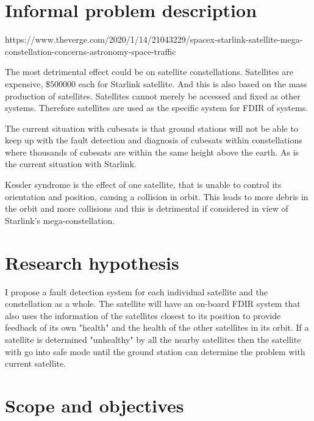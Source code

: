 \section{Informal problem description}

https://www.theverge.com/2020/1/14/21043229/spacex-starlink-satellite-mega-constellation-concerns-astronomy-space-traffic

The most detrimental effect could be on satellite constellations. Satellites are expensive, \$$500 000$ each for Starlink satellite. And this is also based on the mass production of satellites. Satellites cannot merely be accessed and fixed as other systems. Therefore satellites are used as the specific system for FDIR of systems.

The current situation with cubesats is that ground stations will not be able to keep up with the fault detection and diagnosis of cubesats within constellations where thousands of cubesats are within the same height above the earth. As is the current situation with Starlink.

Kessler syndrome is the effect of one satellite, that is unable to control its orientation and position, causing a collision in orbit. This leads to more debris in the orbit and more collisions and this is detrimental if considered in view of Starlink's mega-constellation.

\section{Research hypothesis}
I propose a fault detection system for each individual satellite and the constellation as a whole. The satellite will have an on-board FDIR system that also uses the information of the satellites closest to its position to provide feedback of its own "health" and the health of the other satellites in its orbit. If a satellite is determined "unhealthy" by all the nearby satellites then the satellite with go into safe mode until the ground station can determine the problem with current satellite.

\section{Scope and objectives}

